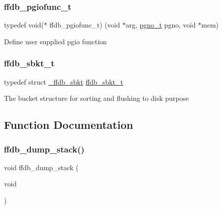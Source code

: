 \mbox{\label{adat-devel_2other__libs_2filedb_2filehash_2ffdb__pagepool_8h_abe9c83a47a1f5babe21df1582aeb8022}} 
\subsubsection{\texorpdfstring{ffdb\_pgiofunc\_t}{ffdb\_pgiofunc\_t}}
{\footnotesize\ttfamily typedef void($\ast$ ffdb\+\_\+pgiofunc\+\_\+t) (void $\ast$arg, \mbox{\hyperlink{adat-devel_2other__libs_2filedb_2filehash_2ffdb__db_8h_a000813331643d38481142bcce7de1501}{pgno\+\_\+t}} pgno, void $\ast$mem)}

Define user supplied pgio function \mbox{\label{adat-devel_2other__libs_2filedb_2filehash_2ffdb__pagepool_8h_a721dc6b888a776fec1cebb5ce4ea68c7}} 
\subsubsection{\texorpdfstring{ffdb\_sbkt\_t}{ffdb\_sbkt\_t}}
{\footnotesize\ttfamily typedef struct \mbox{\hyperlink{struct__ffdb__sbkt}{\+\_\+ffdb\+\_\+sbkt}} \mbox{\hyperlink{adat-devel_2other__libs_2filedb_2filehash_2ffdb__pagepool_8h_a721dc6b888a776fec1cebb5ce4ea68c7}{ffdb\+\_\+sbkt\+\_\+t}}}

The bucket structure for sorting and flushing to disk purpose 

\subsection{Function Documentation}
\mbox{\label{adat-devel_2other__libs_2filedb_2filehash_2ffdb__pagepool_8h_a72c44f8ab92d09c2def5eadf818b8173}} 
\subsubsection{\texorpdfstring{ffdb\_dump\_stack()}{ffdb\_dump\_stack()}}
{\footnotesize\ttfamily void ffdb\+\_\+dump\+\_\+stack (\begin{DoxyParamCaption}\item[{void}]{ }\end{DoxyParamCaption})}

